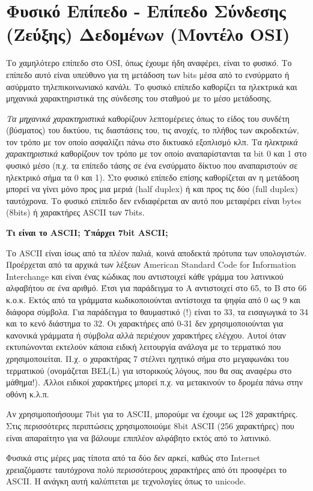 %
%
\section{Φυσικό Επίπεδο - Επίπεδο Σύνδεσης (Ζεύξης) Δεδομένων (Μοντέλο OSI)}

Το χαμηλότερο επίπεδο στο OSI, όπως έχουμε ήδη αναφέρει, είναι το \emph{φυσικό}. Το επίπεδο αυτό είναι υπεύθυνο για τη μετάδοση των bits μέσα από το ενσύρματο ή ασύρματο τηλεπικοινωνιακό κανάλι. Το φυσικό επίπεδο καθορίζει τα ηλεκτρικά και μηχανικά χαρακτηριστικά της σύνδεσης του σταθμού με το μέσο μετάδοσης.

\emph{Τα μηχανικά χαρακτηριστικά} καθορίζουν λεπτομέρειες όπως το  είδος του συνδέτη (βύσματος) του δικτύου, τις διαστάσεις του, τις ανοχές, το πλήθος των ακροδεκτών, τον τρόπο με τον οποίο ασφαλίζει πάνω στο δικτυακό εξοπλισμό κλπ. Τα \emph{ηλεκτρικά χαρακτηριστικά} καθορίζουν τον τρόπο με τον οποίο αναπαρίστανται τα bit 0 και 1 στο φυσικό μέσο (π.χ. τα επίπεδο τάσης σε ένα ενσύρματο δίκτυο που αναπαριστούν σε ηλεκτρικό σήμα τα 0 και 1). Στο φυσικό επίπεδο επίσης καθορίζεται αν η μετάδοση μπορεί να γίνει μόνο προς μια μεριά (half duplex) ή και προς τις δύο (full duplex) ταυτόχρονα. Το φυσικό επίπεδο δεν ενδιαφέρεται αν αυτό που μεταφέρει είναι bytes (8bits) ή χαρακτήρες ASCII των 7bits. 

\begin{inthebox}
\textbf{Τι είναι το ASCII; Υπάρχει 7bit ASCII;}

Το ASCII είναι ίσως από τα πλέον παλιά, κοινά αποδεκτά πρότυπα των υπολογιστών. Προέρχεται από τα αρχικά των λέξεων American Standard Code for Information Interchange και είναι ένας κώδικας που αντιστοιχεί κάθε γράμμα του λατινικού αλφαβήτου σε ένα αριθμό. Έτσι για παράδειγμα το A αντιστοιχεί στο 65, το B στο 66 κ.ο.κ. Εκτός από τα γράμματα κωδικοποιούνται αντίστοιχα τα ψηφία από 0 ως 9 και διάφορα σύμβολα. Για παράδειγμα το θαυμαστικό (!) είναι το 33, τα εισαγωγικά το 34 και το κενό διάστημα το 32. Οι χαρακτήρες από 0-31 δεν χρησιμοποιούνται για κανονικά γράμματα ή σύμβολα αλλά περιέχουν χαρακτήρες ελέγχου. Αυτοί όταν εκτυπώνονται εκτελούν κάποια ειδική λειτουργία ανάλογα με το τερματικό που χρησιμοποιείται. Π.χ. ο χαρακτήρας 7 στέλνει ηχητικό σήμα στο μεγαφωνάκι του τερματικού (ονομάζεται  BEL(L) για ιστορικούς λόγους, που θα σας αναφέρω στο μάθημα!). Άλλοι ειδικοί χαρακτήρες μπορεί π.χ. να μετακινούν το δρομέα πάνω στην οθόνη κ.λ.π.

Αν χρησιμοποιήσουμε 7bit για το ASCII, μπορούμε να έχουμε ως 128 χαρακτήρες. Στις περισσότερες περιπτώσεις χρησιμοποιούμε 8bit ASCII (256 χαρακτήρες) που είναι απαραίτητο για να βάλουμε επιπλέον αλφάβητο εκτός από το λατινικό.

Φυσικά στις μέρες μας τίποτα από τα δύο δεν αρκεί, καθώς στο Internet χρειαζόμαστε ταυτόχρονα πολύ περισσότερους χαρακτήρες από ότι προσφέρει το ASCII. Η ανάγκη αυτή καλύπτεται με τεχνολογίες όπως το unicode.\\
\end{inthebox}

